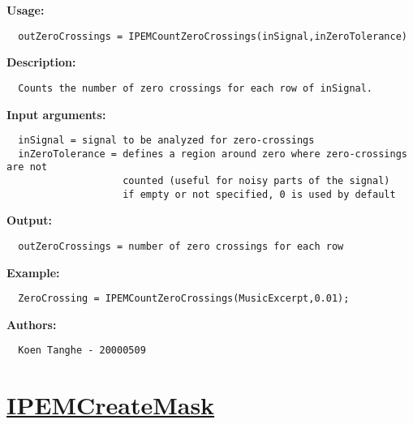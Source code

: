 \textbf{Usage:}
\begin{verbatim}  outZeroCrossings = IPEMCountZeroCrossings(inSignal,inZeroTolerance)

\end{verbatim}
\textbf{Description:}
\begin{verbatim}  Counts the number of zero crossings for each row of inSignal.

\end{verbatim}
\textbf{Input arguments:}
\begin{verbatim}  inSignal = signal to be analyzed for zero-crossings
  inZeroTolerance = defines a region around zero where zero-crossings are not
                    counted (useful for noisy parts of the signal)
                    if empty or not specified, 0 is used by default

\end{verbatim}
\textbf{Output:}
\begin{verbatim}  outZeroCrossings = number of zero crossings for each row

\end{verbatim}
\textbf{Example:}
\begin{verbatim}  ZeroCrossing = IPEMCountZeroCrossings(MusicExcerpt,0.01);

\end{verbatim}
\textbf{Authors:}
\begin{verbatim}  Koen Tanghe - 20000509
\end{verbatim}


\newpage
\section*{\hyperlink{Concepts:IPEMCreateMask}{IPEMCreateMask}}
\hypertarget{FuncRef:IPEMCreateMask}{}

